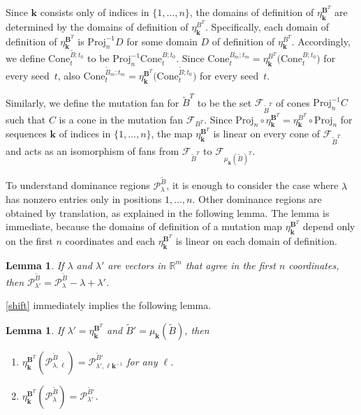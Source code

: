 \documentclass{amsart}
\newtheorem{lemma}[proposition]{Lemma}
\theoremstyle{definition}
\theoremstyle{remark}
\numberwithin{equation}{section}
\newcommand{\reals}{\mathbb R}
\newcommand{\set}[1]{{\lbrace #1 \rbrace}}
\newcommand{\GG}{{\mathbf G}}
\newcommand{\F}{{\mathcal F}}
\newcommand{\0}{{\mathbf{0}}}
\newcommand{\Cone}{\mathrm{Cone}}
\newcommand{\Proj}{\mathrm{Proj}}
\newcommand{\kk}{{\boldsymbol{k}}}
\renewcommand{\ll}{{\boldsymbol\ell}}
\newcommand{\tB}{{\tilde{B}}}
\newcommand{\BB}{\mathbf{B}}
\renewcommand{\P}{\mathcal{P}}
\begin{document}
Since $\kk$ consists only of indices in $\set{1,\ldots,n}$, the domains of definition of $\eta_\kk^{\BB^T}$ are determined by the domains of definition of $\eta_\kk^{B^T}$.
Specifically, each domain of definition of $\eta_\kk^{\BB^T}$ is $\Proj_n^{-1}D$ for some domain $D$ of definition of $\eta_\kk^{B^T}$.
Accordingly, we define $\Cone_t^{\tB;t_0}$ to be %
$\Proj_n^{-1}\Cone_t^{B;t_0}$.
Since $\Cone_t^{B_m;t_m}=\eta_\kk^{B^T}\bigl(\Cone_t^{B;t_0}\bigr)$ for every seed~$t$, also $\Cone_t^{\tB_m;t_m}=\eta_\kk^{\BB^T}\bigl(\Cone_t^{\tB;t_0}\bigr)$ for every seed~$t$.

Similarly, we define the mutation fan for $\tB^T$ to be the set $\F_{\tB^T}$ of cones $\Proj_n^{-1}C$ such that $C$ is a cone in the mutation fan $\F_{B^T}$.
Since $\Proj_n\circ\eta_\kk^{\BB^T}=\eta_\kk^{B^T}\circ\Proj_n$ for sequences $\kk$ of indices in $\set{1,\ldots,n}$, the map $\eta_\kk^{\BB^T}$ is linear on every cone of $\F_{\tB^T}$ and acts as an isomorphism of fans from $\F_{\tB^T}$ to $\F_{\mu_\kk(\tB)^T}$.

To understand dominance regions $\P^\tB_\lambda$, it is enough to consider the case where $\lambda$ has nonzero entries only in positions $1,\ldots,n$.
Other dominance regions are obtained by translation, as explained in the following lemma.
The lemma is immediate, because the domains of definition of a mutation map $\eta_\kk^{\BB^T}$ depend only on the first $n$ coordinates and each $\eta_\kk^{\BB^T}$ is linear on each domain of definition.
\begin{lemma}\label{after all coefficients are just coefficients}
If $\lambda$ and $\lambda'$ are vectors in $\reals^m$ that agree in the first $n$ coordinates, then $\P^\tB_{\lambda'}=\P^\tB_\lambda-\lambda+\lambda'$.
\end{lemma}

\cref{shift} immediately implies the following lemma.
\begin{lemma}\label{shift extended}
If $\lambda'=\eta^{\BB^T}_\kk$ and $\tB'=\mu_\kk(\tB)$, then 
\begin{enumerate}[\quad\bf1.]
\item \label{shift extended one}
$\eta^{\BB^T}_\kk\!\!(\P^\tB_{\lambda,\ll})=\P^{\tB'}_{\lambda',\ll\kk^{-1}}$ for any $\ll$.
\item \label{shift extended all}
$\eta^{\BB^T}_\kk\!\!(\P^\tB_\lambda)=\P^{\tB'}_{\lambda'}$.
\end{enumerate}
\end{lemma}
\end{document}
